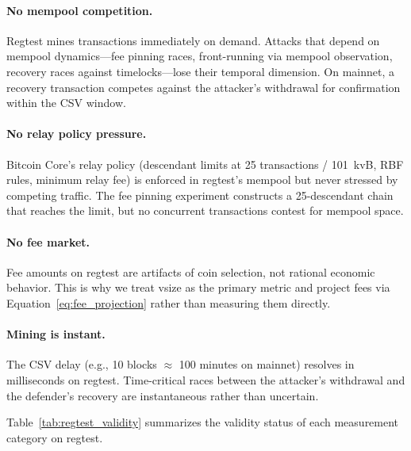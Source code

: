 \paragraph{No mempool competition.} Regtest mines transactions immediately on demand.
Attacks that depend on mempool dynamics---fee pinning races, front-running via mempool
observation, recovery races against timelocks---lose their temporal dimension. On
mainnet, a recovery transaction competes against the attacker's withdrawal for
confirmation within the CSV window.

\paragraph{No relay policy pressure.} Bitcoin Core's relay policy (descendant limits
at 25 transactions / 101~kvB, RBF rules, minimum relay fee) is enforced in regtest's
mempool but never stressed by competing traffic. The fee pinning experiment constructs
a 25-descendant chain that reaches the limit, but no concurrent transactions contest
for mempool space.

\paragraph{No fee market.} Fee amounts on regtest are artifacts of coin selection, not
rational economic behavior. This is why we treat vsize as the primary metric and
project fees via Equation~\ref{eq:fee_projection} rather than measuring them directly.

\paragraph{Mining is instant.} The CSV delay (e.g., 10 blocks $\approx$ 100 minutes on
mainnet) resolves in milliseconds on regtest. Time-critical races between the attacker's
withdrawal and the defender's recovery are instantaneous rather than uncertain.

Table~\ref{tab:regtest_validity} summarizes the validity status of each measurement
category on regtest.

